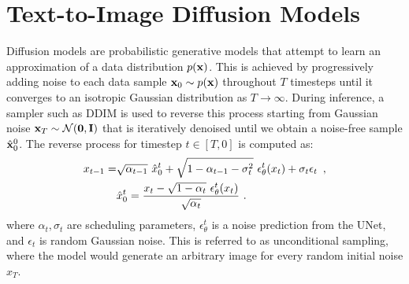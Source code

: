 \section{Text-to-Image Diffusion Models}
\label{sec:prel}
Diffusion models are probabilistic generative models that attempt to learn an approximation of a data distribution $p(\mathbf{x})$.
This is achieved by progressively adding noise to each data sample ${\mathbf{x}_0 \sim p(\mathbf{x})}$ throughout $T$ timesteps until it converges to an isotropic Gaussian distribution as $T \rightarrow \infty$.
During inference, a sampler such as DDIM \citep{ddim} is used to reverse this process starting from Gaussian noise $\mathbf{x}_T \sim \mathcal{N}(\mathbf{0}, \mathbf{I})$ that is iteratively denoised until we obtain a noise-free sample $\hat{\mathbf{x}}_0^0$.
The reverse process for timestep $t \in [T, 0]$ is computed as:
\begin{equation}\label{eq:ddim}
    \begin{aligned}
        x_{t-1} = &\sqrt{\alphatm} \ \hat{x}_0^t + \sqrt{1 - \alphatm - \sigma^2_t} \ \epsilon^t_\theta(x_t) + \sigma_t \epsilon_t \enspace, \\
        & \hat{x}_0^t = \frac{x_t-\sqrt{1-\alpha_t} \ \epsilon_\theta^t(x_t)}{\sqrt{\alpha_t}} \ .
    \end{aligned}
\end{equation}
where $\alpha_t, \sigma_t$ are scheduling parameters, $\epsilon_\theta^t$ is a noise prediction from the UNet, and $\epsilon_t$ is random Gaussian noise.
This is referred to as unconditional sampling, where the model would generate an arbitrary image for every random initial noise $x_T$.

